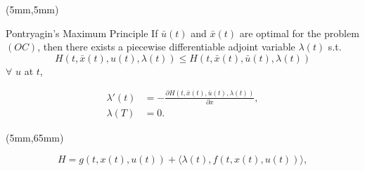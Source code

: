 \begin{frame}[plain]
	\begin{textblock*}{120mm}(5mm,5mm)
		\begin{graybox}{Pontryagin’s Maximum Principle}
			If $\bar{u}(t)$ and $\bar{x}(t)$ are optimal for the problem $(OC)$, then there exists a piecewise differentiable adjoint variable $\lambda(t)$ s.t.
				\begin{equation*}
					H(t,\bar{x}(t),u(t),\lambda(t))\leq H(t,\bar{x}(t),\bar{u}(t),\lambda(t))
				\end{equation*}
			$\forall$ $u$ at $t$,

				\begin{align*}
					\lambda'(t) &= -\frac{\partial H(t,\bar{x}(t),\bar{u}(t),\lambda(t))}{\partial x},\\
					\lambda(T) &= 0.
				\end{align*}
		\end{graybox}
		
	\end{textblock*}
		\begin{textblock*}{75mm}(5mm,65mm)
		\begin{yellowbox}{}
			\begin{equation*}
			H=g(t,x(t),u(t))+\langle \lambda(t),f(t,x(t),u(t))\rangle,
			\end{equation*}
		\end{yellowbox}
	\end{textblock*}
\end{frame}

